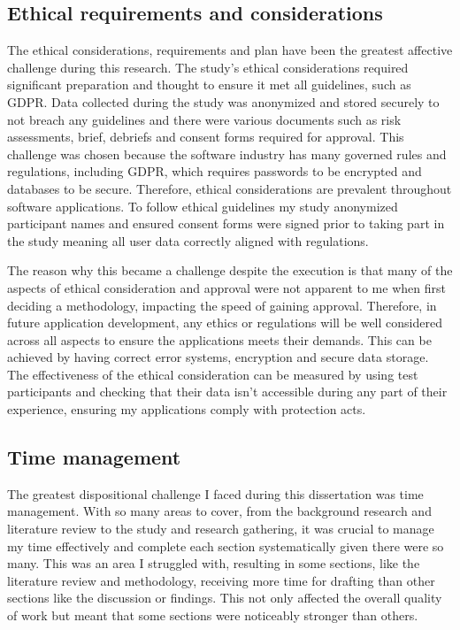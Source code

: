 \documentclass[article]{IEEEtran}
\begin{document}
            \subsection{Ethical requirements and considerations}
                The ethical considerations, requirements and plan have been the greatest affective challenge during this research. The study's ethical considerations required significant preparation and thought to ensure it met all guidelines, such as GDPR. Data collected during the study was anonymized and stored securely to not breach any guidelines and there were various documents such as risk assessments, brief, debriefs and consent forms required for approval. This challenge was chosen because the software industry has many governed rules and regulations, including GDPR, which requires passwords to be encrypted and databases to be secure. Therefore, ethical considerations are prevalent throughout software applications. To follow ethical guidelines my study anonymized participant names and ensured consent forms were signed prior to taking part in the study meaning all user data correctly aligned with regulations. 
                
                The reason why this became a challenge despite the execution is that many of the aspects of ethical consideration and approval were not apparent to me when first deciding a methodology, impacting the speed of gaining approval. Therefore, in future application development, any ethics or regulations will be well considered across all aspects to ensure the applications meets their demands. This can be achieved by having correct error systems, encryption and secure data storage. The effectiveness of the ethical consideration can be measured by using test participants and checking that their data isn't accessible during any part of their experience, ensuring my applications comply with protection acts.

            \subsection{Time management}
                The greatest dispositional challenge I faced during this dissertation was time management. With so many areas to cover, from the background research and literature review to the study and research gathering, it was crucial to manage my time effectively and complete each section systematically given there were so many. This was an area I struggled with, resulting in some sections, like the literature review and methodology, receiving more time for drafting than other sections like the discussion or findings. This not only affected the overall quality of work but meant that some sections were noticeably stronger than others. 
                
\end{document}
